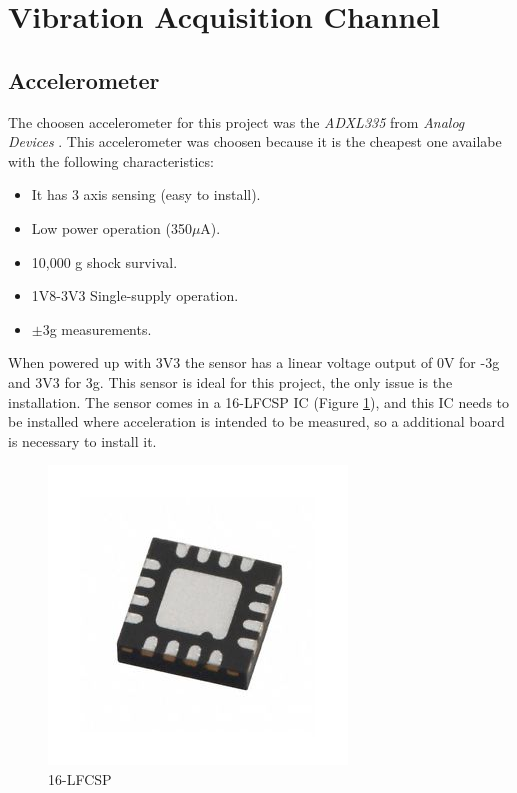 \section{Vibration Acquisition Channel}\label{sec:vibration-acquisition-channel}

\subsection{Accelerometer}\label{ssec:accelerometer-signal}
	The choosen accelerometer for this project was the \textit{ADXL335} from \textit{Analog Devices} \cite{devices2010adxl335}. This accelerometer was choosen because it is the cheapest one availabe with the following characteristics:

	\begin{itemize}
		\item It has 3 axis sensing (easy to install).
		\item Low power operation (350$\mu$A).
		\item 10,000 g shock survival.
		\item 1V8-3V3 Single-supply operation.
		\item $\pm$3g measurements.
	\end{itemize}

	When powered up with 3V3 the sensor has a linear voltage output of 0V for -3g and 3V3 for 3g. This sensor is ideal for this project, the only issue is the installation. The sensor comes in a 16-LFCSP IC (Figure \ref{fig:16lfcsp}), and this IC needs to be installed where acceleration is intended to be measured, so a additional board is necessary to install it. 

	\begin{figure}[htbp]
		\centering
		\includegraphics[width=.5\textwidth]{figuras/fig-16lfcsp.jpg}
		\caption{16-LFCSP \cite{16lfcsp}}
		\label{fig:16lfcsp}
	\end{figure}


